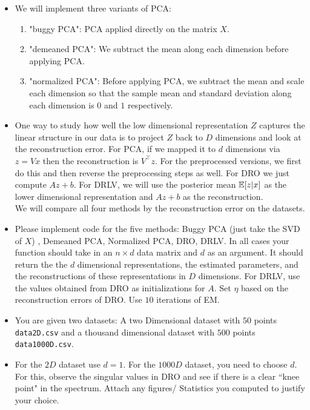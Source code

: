\begin{itemize}
\item We will implement three variants of PCA:
\begin{enumerate}
    \item "buggy PCA": PCA applied directly on the matrix $X$.
    \item "demeaned PCA": We subtract the mean along each dimension before applying PCA.
    \item "normalized PCA": Before applying PCA, we subtract the mean and scale each dimension so that the sample  mean and standard deviation along each dimension is $0$ and $1$ respectively.
    
\end{enumerate}



\item 
One way to study how well the low dimensional representation $Z$ captures the linear
structure in our data is to project $Z$ back to $D$ dimensions and look at the reconstruction
error. For PCA, if we mapped it to $d$ dimensions via $z = Vx$ then the
reconstruction is $V^\top z$. For the preprocessed versions, we first do this and then
reverse the preprocessing steps as well. For DRO  we just compute $Az + b$.
For DRLV, we will use the posterior mean $\mathbb{E}[z|x]$ as the lower dimensional
representation and $Az + b$ as the reconstruction. \\
We will compare all four methods by the reconstruction error on the datasets.

\item 
Please implement code for the five methods: Buggy PCA (just take the SVD of $X$)
, Demeaned PCA,
Normalized PCA, DRO, DRLV. In all cases your function should take in
an $n \times d$ data matrix and $d$ as an argument. It should return the
the $d$ dimensional representations, the estimated parameters, and the
reconstructions of these representations in $D$ dimensions. 
For DRLV, use the values obtained from DRO as initializations for $A$. Set $\eta$
based on the reconstruction errors of DRO.
Use $10$ iterations of EM.

\item
You are given two datasets: A two Dimensional dataset with $50$ points 
\texttt{data2D.csv} and a thousand dimensional dataset with $500$ points
\texttt{data1000D.csv}. 

\item
For the $2D$ dataset use $d=1$. For the $1000D$ dataset, you need to choose
$d$. For this, observe the singular values in DRO and see if there is a clear
``knee point" in the spectrum.
Attach any figures/ Statistics you computed to justify your choice.


\end{itemize}
